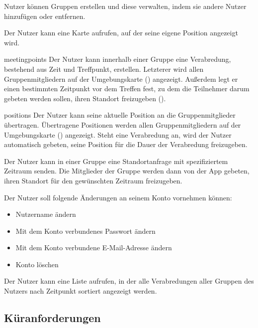 \documentclass[parskip=full,11pt]{scrartcl}
\begin{document}
%
Nutzer können Gruppen erstellen und diese verwalten, indem sie andere Nutzer
hinzufügen oder entfernen.

%
Der Nutzer kann eine Karte aufrufen, auf der seine eigene Position angezeigt
wird.

    {meetingpoints}
%
Der Nutzer kann innerhalb einer Gruppe eine Verabredung, bestehend aus
Zeit und Treffpunkt, erstellen. Letzterer wird allen Gruppenmitgliedern auf der
Umgebungskarte () angezeigt.
Außerdem legt er einen bestimmten Zeitpunkt vor dem Treffen fest,
zu dem die Teilnehmer darum gebeten werden sollen,
ihren Standort freizugeben ().

    {positions}
%
Der Nutzer kann seine aktuelle Position an die Gruppenmitglieder übertragen.
Übertragene Positionen werden allen Gruppenmitgliedern auf der Umgebungskarte
() angezeigt.
Steht eine Verabredung an, wird der Nutzer automatisch gebeten, seine Position
für die Dauer der Verabredung freizugeben.

%
Der Nutzer kann in einer Gruppe eine Standortanfrage mit spezifiziertem
Zeitraum senden.
Die Mitglieder der Gruppe werden dann von der App gebeten,
ihren Standort für den gewünschten Zeitraum freizugeben.

%
Der Nutzer soll folgende Änderungen an seinem Konto vornehmen können:
\begin{itemize}
		\item Nutzername ändern
    \item Mit dem Konto verbundenes Passwort ändern
    \item Mit dem Konto verbundene E-Mail-Adresse ändern
    \item Konto löschen
\end{itemize}

%
%
Der Nutzer kann eine Liste aufrufen, in der alle Verabredungen aller Gruppen
des Nutzers nach Zeitpunkt sortiert angezeigt werden.

\subsection{Küranforderungen}
\end{document}
